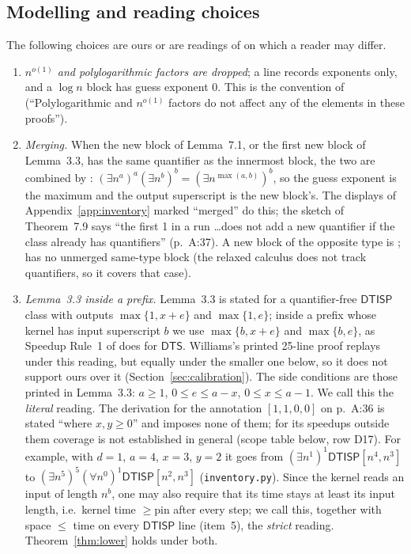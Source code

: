 \documentclass[11pt]{article}
\theoremstyle{definition}
\newcommand{\DTISP}{\mathsf{DTISP}}
\newcommand{\leanus}{\textunderscore\allowbreak}
\newcommand{\lean}[1]{\ifmmode\text{\ttfamily #1}\else{\ttfamily\let\_\leanus #1}\fi}
\newcommand{\pin}{\mathrm{pin}}
\begin{document}
\subsection{Modelling and reading choices}\label{sec:reading}
The following choices are ours or are readings of \cite{W13} on which a reader may differ.
\begin{enumerate}
\item \emph{$n^{o(1)}$ and polylogarithmic factors are dropped}; a line records exponents only, and a $\log n$ block has guess exponent $0$. This is the convention of \cite[\S4, p.~A:9]{W13} (``Polylogarithmic and $n^{o(1)}$ factors do not affect any of the elements in these proofs'').
\item \emph{Merging.} When the new block of Lemma~7.1, or the first new block of Lemma~3.3, has the same quantifier as the innermost block, the two are combined by \cite[\S2]{W13}: $(\exists n^a)^a(\exists n^b)^b=(\exists n^{\max(a,b)})^b$, so the guess exponent is the maximum and the output superscript is the new block's. The displays of Appendix~\ref{app:inventory} marked ``merged'' do this; the sketch of Theorem~7.9 says ``the first 1 in a run \dots does not add a new quantifier if the class already has quantifiers'' (p.~A:37). A new block of the opposite type is \lean{convNew}; \lean{HY.Step} has no unmerged same-type block (the relaxed calculus does not track quantifiers, so it covers that case).
\item \emph{Lemma~3.3 inside a prefix.} Lemma~3.3 is stated for a quantifier-free $\DTISP$ class with outputs $\max\{1,x+e\}$ and $\max\{1,e\}$; inside a prefix whose kernel has input superscript $b$ we use $\max\{b,x+e\}$ and $\max\{b,e\}$, as Speedup Rule~1 of \cite[Definition~4.1]{W13} does for $\mathsf{DTS}$. Williams's printed 25-line proof replays under this reading, but equally under the smaller one below, so it does not support ours over it (Section~\ref{sec:calibration}). The side conditions are those printed in Lemma~3.3: $a\ge1$, $0\le e\le a-x$, $0\le x\le a-1$. We call this the \emph{literal} reading. The derivation for the annotation $[1,1,0,0]$ on p.~A:36 is stated ``where $x,y\ge0$'' and imposes none of them; for its speedups outside them coverage is not established in general (scope table below, row D17). For example, with $d=1$, $a=4$, $x=3$, $y=2$ it goes from $(\exists n^1)^1\DTISP[n^4,n^3]$ to $(\exists n^5)^5(\forall n^0)^1\DTISP[n^2,n^3]$ (\texttt{inventory.py}). Since the kernel reads an input of length $n^{b}$, one may also require that its time stays at least its input length, i.e.\ kernel time $\ge\pin$ after every step; we call this, together with space $\le$ time on every $\DTISP$ line (item~5), the \emph{strict} reading. Theorem~\ref{thm:lower} holds under both.


\end{enumerate}
\end{document}
